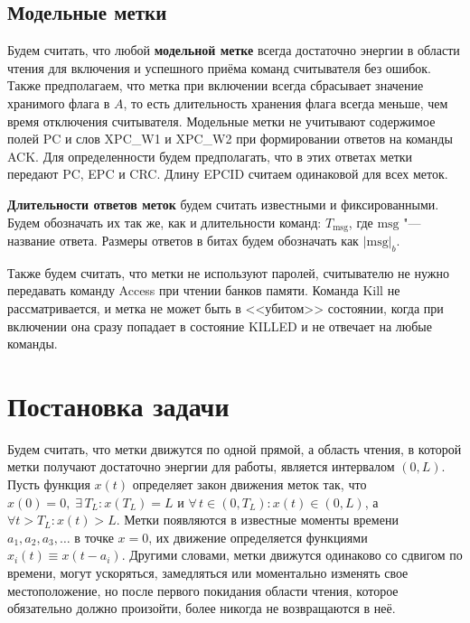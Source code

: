\subsection{Модельные метки}
Будем считать, что любой \textbf{модельной метке} всегда достаточно энергии в области чтения для включения и успешного приёма команд считывателя без ошибок. Также предполагаем, что метка при включении всегда сбрасывает значение хранимого флага в $A$, то есть длительность хранения флага всегда меньше, чем время отключения считывателя. Модельные метки не учитывают содержимое полей PC и слов XPC\_W1 и XPC\_W2 при формировании ответов на команды ACK. Для определенности будем предполагать, что в этих ответах метки передают PC, EPC и CRC. Длину EPCID считаем одинаковой для всех меток.

\textbf{Длительности ответов меток} будем считать известными и фиксированными. Будем обозначать их так же, как и длительности команд: $T_\text{msg}$, где $\text{msg}$ "--- название ответа. Размеры ответов в битах будем обозначать как $|\text{msg}|_b$.

Также будем считать, что метки не используют паролей, считывателю не нужно передавать команду Access при чтении банков памяти. Команда Kill не рассматривается, и метка не может быть в <<убитом>> состоянии, когда при включении она сразу попадает в состояние KILLED и не отвечает на любые команды.




\section{Постановка задачи}\label{sec:ch3_problem_definition}
Будем считать, что метки движутся по одной прямой, а область чтения, в которой метки получают достаточно энергии для работы, является интервалом $(0, L)$. Пусть функция $x(t)$ определяет закон движения меток так, что $x(0) = 0,\; \exists\,T_L: x(T_L) = L$ и $\forall\, t \in (0, T_L): x(t) \in (0, L)$, а $\forall t > T_L: x(t) > L$. Метки появляются в известные моменты времени $a_1, a_2, a_3, \dots$ в точке $x=0$, их движение определяется функциями $x_i(t) \equiv x(t - a_i)$. Другими словами, метки движутся одинаково со сдвигом по времени, могут ускоряться, замедляться или моментально изменять свое местоположение, но после первого покидания области чтения, которое обязательно должно произойти, более никогда не возвращаются в неё.

